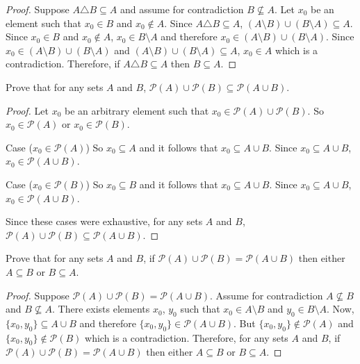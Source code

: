 \begin{proof}
    Suppose $A \triangle B \subseteq A$ and assume for contradiction $B \not \subseteq A$.
    Let $x_0$ be an element such that $x_0 \in B$ and $x_0 \not \in A$.
    Since $A \triangle B \subseteq A$, $(A \setminus B) \cup (B \setminus A) \subseteq A$.
    Since $x_0 \in B$ and $x_0 \not \in A$, $x_0 \in B \setminus A$ and therefore $x_0 \in (A \setminus B) \cup (B \setminus A)$.
    Since $x_0 \in (A \setminus B) \cup (B \setminus A)$ and $(A \setminus B) \cup (B \setminus A) \subseteq A$, $x_0 \in A$
    which is a contradiction.
    Therefore, if $A \triangle B \subseteq A$ then $B \subseteq A$.
\end{proof}

\begin{tcolorbox}[title=Problem 8, breakable]
    Prove that for any sets $A$ and $B$, $\mathcal{P}(A) \cup \mathcal{P}(B) \subseteq \mathcal{P}(A \cup B)$.
\end{tcolorbox}

\begin{proof}
    Let $x_0$ be an arbitrary element such that $x_0 \in \mathcal{P}(A) \cup \mathcal{P}(B)$.
    So $x_0 \in \mathcal{P}(A)$ or $x_0 \in \mathcal{P}(B)$.

    Case ($x_0 \in \mathcal{P}(A)$) So $x_0 \subseteq A$ and it follows that $x_0
        \subseteq A \cup B$. Since $x_0 \subseteq A \cup B$, $x_0 \in \mathcal{P}(A
        \cup B)$.

    Case ($x_0 \in \mathcal{P}(B)$) So $x_0 \subseteq B$ and it follows that $x_0
        \subseteq A \cup B$. Since $x_0 \subseteq A \cup B$, $x_0 \in \mathcal{P}(A
        \cup B)$.

    Since these cases were exhaustive, for any sets $A$ and $B$, $\mathcal{P}(A)
        \cup \mathcal{P}(B) \subseteq \mathcal{P}(A \cup B)$.
\end{proof}

\begin{tcolorbox}[title=Problem 9, breakable]
    Prove that for any sets $A$ and $B$, if $\mathcal{P}(A) \cup \mathcal{P}(B) = \mathcal{P}(A \cup B)$
    then either $A \subseteq B$ or $B \subseteq A$.
\end{tcolorbox}

\begin{proof}
    Suppose $\mathcal{P}(A) \cup \mathcal{P}(B) = \mathcal{P}(A \cup B)$.
    Assume for contradiction $A \not \subseteq B$ and $B \not \subseteq A$.
    There exists elements $x_0$, $y_0$ such that $x_0 \in A \setminus B$
    and $y_0 \in B \setminus A$.
    Now, $\{x_0, y_0\} \subseteq A \cup B$ and therefore
    $\{x_0, y_0\} \in \mathcal{P}(A \cup B)$.
    But $\{x_0, y_0\} \not \in \mathcal{P}(A)$ and 
    $\{x_0, y_0\} \not \in \mathcal{P}(B)$ which is a contradiction.
    Therefore, for any sets $A$ and $B$, if $\mathcal{P}(A) \cup \mathcal{P}(B)
        = \mathcal{P}(A \cup B)$
    then either $A \subseteq B$ or $B \subseteq A$.
\end{proof}

